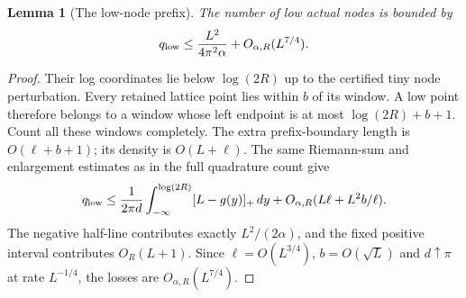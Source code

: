 \documentclass[11pt]{article}
\newtheorem{lemma}[theorem]{Lemma}
\numberwithin{equation}{section}
\begin{document}
\begin{lemma}[The low-node prefix]\label{lem:prefix}
The number of low actual nodes is bounded by
\begin{equation}\label{eq:low-count}
 q_{\rm low}\le\frac{L^2}{4\pi^2\alpha}
                             +O_{\alpha,R}(L^{7/4}).
\end{equation}
\end{lemma}
\begin{proof}
Their log coordinates lie below $\log(2R)$ up to the certified tiny
node perturbation. Every retained lattice point lies within $b$ of
its window. A low point therefore belongs to a window whose left
endpoint is at most $\log(2R)+b+1$. Count all these windows completely.
The extra prefix-boundary length is $O(\ell+b+1)$; its density is
$O(L+\ell)$. The same Riemann-sum and enlargement estimates as in
the full quadrature count give
\[
 q_{\rm low}\le\frac1{2\pi d}
     \int_{-\infty}^{\log(2R)}[L-g(y)]_+\,dy
       +O_{\alpha,R}(L\ell+L^2b/\ell).
\]
The negative half-line contributes exactly $L^2/(2\alpha)$, and
the fixed positive interval contributes $O_R(L+1)$. Since
$\ell=O(L^{3/4})$, $b=O(\sqrt L)$ and $d\uparrow\pi$ at rate
$L^{-1/4}$, the losses are $O_{\alpha,R}(L^{7/4})$.
\end{proof}
\end{document}
